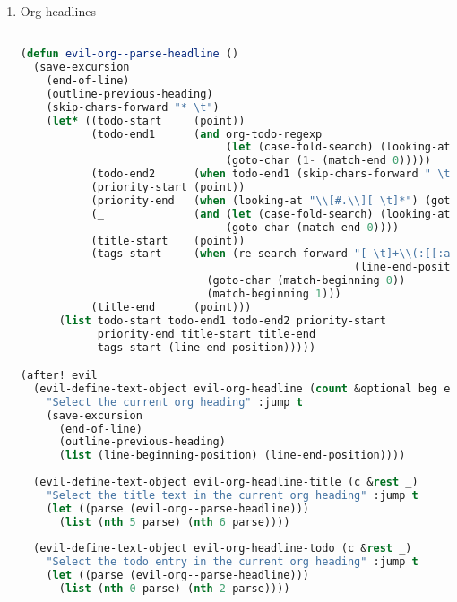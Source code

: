 \documentclass[11pt]{article}
\begin{document}
\begin{enumerate}
  
\begin{enumerate}
  \item Org headlines
  \label{sec:org-headlines}

  \begin{lstlisting}[language=Lisp]%! Someone please complete this list for me

(defun evil-org--parse-headline ()
  (save-excursion
    (end-of-line)
    (outline-previous-heading)
    (skip-chars-forward "* \t")
    (let* ((todo-start     (point))
           (todo-end1      (and org-todo-regexp
                                (let (case-fold-search) (looking-at (concat org-todo-regexp " ")))
                                (goto-char (1- (match-end 0)))))
           (todo-end2      (when todo-end1 (skip-chars-forward " \t") (point)))
           (priority-start (point))
           (priority-end   (when (looking-at "\\[#.\\][ \t]*") (goto-char (match-end 0))))
           (_              (and (let (case-fold-search) (looking-at org-comment-string))
                                (goto-char (match-end 0))))
           (title-start    (point))
           (tags-start     (when (re-search-forward "[ \t]+\\(:[[:alnum:]_@#%:]+:\\)[ \t]*$"
                                                    (line-end-position) 'move)
                             (goto-char (match-beginning 0))
                             (match-beginning 1)))
           (title-end      (point)))
      (list todo-start todo-end1 todo-end2 priority-start
            priority-end title-start title-end
            tags-start (line-end-position)))))

(after! evil
  (evil-define-text-object evil-org-headline (count &optional beg end type)
    "Select the current org heading" :jump t
    (save-excursion
      (end-of-line)
      (outline-previous-heading)
      (list (line-beginning-position) (line-end-position))))
  
  (evil-define-text-object evil-org-headline-title (c &rest _)
    "Select the title text in the current org heading" :jump t
    (let ((parse (evil-org--parse-headline)))
      (list (nth 5 parse) (nth 6 parse))))
  
  (evil-define-text-object evil-org-headline-todo (c &rest _)
    "Select the todo entry in the current org heading" :jump t
    (let ((parse (evil-org--parse-headline)))
      (list (nth 0 parse) (nth 2 parse))))
  

\end{lstlisting}
\end{enumerate}
\end{enumerate}
\end{document}
